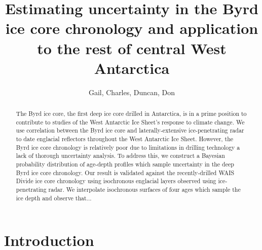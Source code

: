 \documentclass[letterpaper]{igs}
\begin{document}
\title{Estimating uncertainty in the Byrd ice core chronology and application to the rest of central West Antarctica}
\author{Gail, Charles, Duncan, Don}
\maketitle

\begin{abstract}

The Byrd ice core, the first deep ice core drilled in Antarctica, is in a prime position to contribute to studies of the West Antarctic Ice Sheet's response to climate change. We use correlation between the Byrd ice core and laterally-extensive ice-penetrating radar to date englacial reflectors throughout the West Antarctic Ice Sheet. However, the Byrd ice core chronology is relatively poor due to limitations in drilling technology a lack of thorough uncertainty analysis. To address this, we construct a Bayesian probability distribution of age-depth profiles which sample uncertainty in the deep Byrd ice core chronology. Our result is validated against the recently-drilled WAIS Divide ice core chronology using isochronous englacial layers observed using ice-penetrating radar. We interpolate isochronous surfaces of four ages which sample the ice depth and observe that...

\end{abstract}
%

\section{Introduction}\label{intro}
	
	
\end{document}
